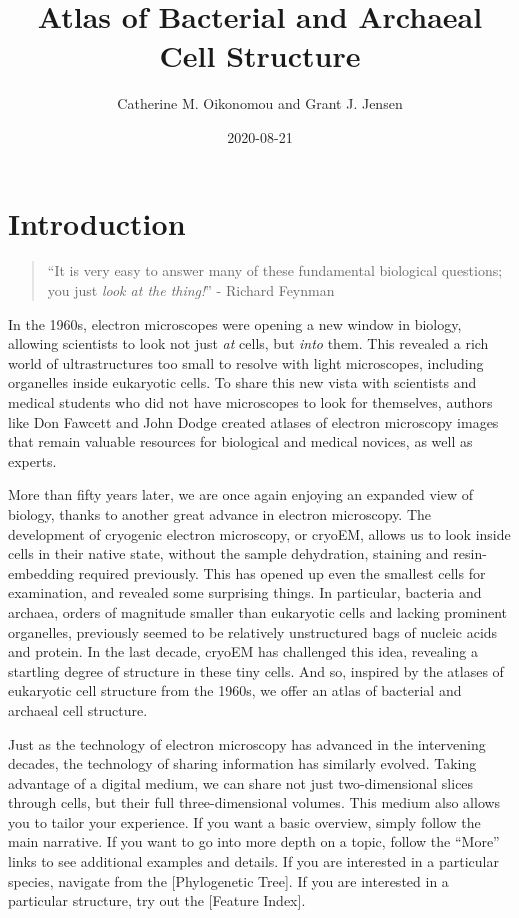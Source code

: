 \documentclass[]{tufte-book}
\title{Atlas of Bacterial and Archaeal Cell Structure}
\author{Catherine M. Oikonomou and Grant J. Jensen}
\date{2020-08-21}
\begin{document}
\maketitle



{
\setcounter{tocdepth}{1}
\tableofcontents
}

\chapter*{Introduction}\label{introduction}

\begin{quote}
``It is very easy to answer many of these fundamental biological
questions; you just \emph{look at the thing!}'' - Richard Feynman
\citep{feynman1960}
\end{quote}

In the 1960s, electron microscopes were opening a new window in biology,
allowing scientists to look not just \emph{at} cells, but \emph{into}
them. This revealed a rich world of ultrastructures too small to resolve
with light microscopes, including organelles inside eukaryotic cells. To
share this new vista with scientists and medical students who did not
have microscopes to look for themselves, authors like Don Fawcett
\citep{fawcett1966} and John Dodge \citep{dodge1968} created atlases of
electron microscopy images that remain valuable resources for biological
and medical novices, as well as experts.

More than fifty years later, we are once again enjoying an expanded view
of biology, thanks to another great advance in electron microscopy. The
development of cryogenic electron microscopy, or cryoEM, allows us to
look inside cells in their native state, without the sample dehydration,
staining and resin-embedding required previously. This has opened up
even the smallest cells for examination, and revealed some surprising
things. In particular, bacteria and archaea, orders of magnitude smaller
than eukaryotic cells and lacking prominent organelles, previously
seemed to be relatively unstructured bags of nucleic acids and protein.
In the last decade, cryoEM has challenged this idea, revealing a
startling degree of structure in these tiny cells. And so, inspired by
the atlases of eukaryotic cell structure from the 1960s, we offer an
atlas of bacterial and archaeal cell structure.

Just as the technology of electron microscopy has advanced in the
intervening decades, the technology of sharing information has similarly
evolved. Taking advantage of a digital medium, we can share not just
two-dimensional slices through cells, but their full three-dimensional
volumes. This medium also allows you to tailor your experience. If you
want a basic overview, simply follow the main narrative. If you want to
go into more depth on a topic, follow the ``More'' links to see
additional examples and details. If you are interested in a particular
species, navigate from the {[}Phylogenetic Tree{]}. If you are
interested in a particular structure, try out the {[}Feature Index{]}.
\end{document}
